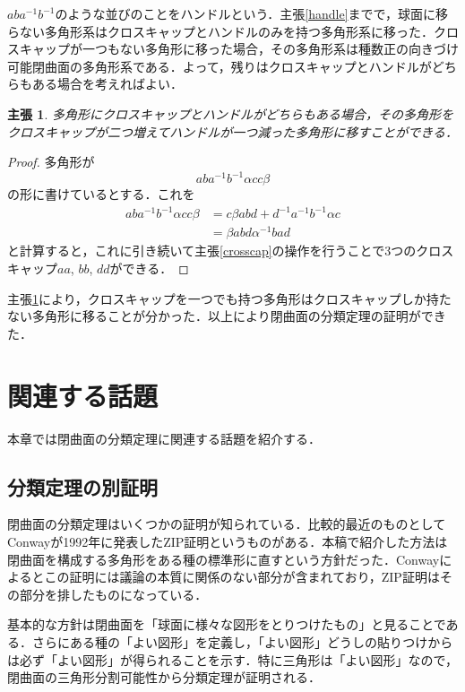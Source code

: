 \documentclass[dvipdfmx,uplatex]{jsarticle}
\newtheorem{claimindep}{主張}
\begin{document}
$aba^{-1}b^{-1}$のような並びのことをハンドルという．主張\ref{handle}までで，球面に移らない多角形系はクロスキャップとハンドルのみを持つ多角形系に移った．クロスキャップが一つもない多角形に移った場合，その多角形系は種数正の向きづけ可能閉曲面の多角形系である．よって，残りはクロスキャップとハンドルがどちらもある場合を考えればよい．

\begin{claimindep}\label{crosscap handle}
多角形にクロスキャップとハンドルがどちらもある場合，その多角形をクロスキャップが二つ増えてハンドルが一つ減った多角形に移すことができる．
\end{claimindep}

\begin{proof}
多角形が
\[ aba^{-1}b^{-1}\alpha cc \beta \]
の形に書けているとする．これを
\begin{align*}
      aba^{-1}b^{-1}\alpha cc \beta
  &= c\beta abd+d^{-1}a^{-1}b^{-1}\alpha c \\
  &= \beta abd\alpha^{-1}bad
\end{align*}
と計算すると，これに引き続いて主張\ref{crosscap}の操作を行うことで3つのクロスキャップ$aa$, $bb$, $dd$ができる．
\end{proof}

主張\ref{crosscap handle}により，クロスキャップを一つでも持つ多角形はクロスキャップしか持たない多角形に移ることが分かった．以上により閉曲面の分類定理の証明ができた．

\section{関連する話題}
本章では閉曲面の分類定理に関連する話題を紹介する．

\subsection{分類定理の別証明}
閉曲面の分類定理はいくつかの証明が知られている．比較的最近のものとしてConwayが1992年に発表したZIP証明というものがある．本稿で紹介した方法は閉曲面を構成する多角形をある種の標準形に直すという方針だった．Conwayによるとこの証明には議論の本質に関係のない部分が含まれており，ZIP証明はその部分を排したものになっている．

基本的な方針は閉曲面を「球面に様々な図形をとりつけたもの」と見ることである．さらにある種の「よい図形」を定義し，「よい図形」どうしの貼りつけからは必ず「よい図形」が得られることを示す．特に三角形は「よい図形」なので，閉曲面の三角形分割可能性から分類定理が証明される．
\end{document}
